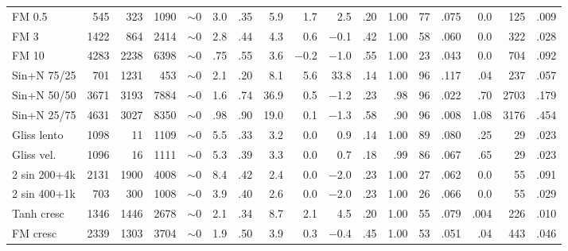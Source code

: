 \documentclass[a4paper,11pt]{article}
\begin{document}
{\begin{longtable}{l|rrrrr|rrrrr|rrr|rrr}
\midrule

FM 0.5
& 545 & 323 & 1090 & $\sim$0 & 3.0
& .35 & 5.9 & 1.7 & 2.5 & .20
& 1.00 & 77 & .075
& 0.0 & 125 & .009 \\

FM 3
& 1422 & 864 & 2414 & $\sim$0 & 2.8
& .44 & 4.3 & 0.6 & $-$0.1 & .42
& 1.00 & 58 & .060
& 0.0 & 322 & .028 \\

FM 10
& 4283 & 2238 & 6398 & $\sim$0 & .75
& .55 & 3.6 & $-$0.2 & $-$1.0 & .55
& 1.00 & 23 & .043
& 0.0 & 704 & .092 \\

\midrule

Sin+N 75/25
& 701 & 1231 & 453 & $\sim$0 & 2.1
& .20 & 8.1 & 5.6 & 33.8 & .14
& 1.00 & 96 & .117
& .04 & 237 & .057 \\

Sin+N 50/50
& 3671 & 3193 & 7884 & $\sim$0 & 1.6
& .74 & 36.9 & 0.5 & $-$1.2 & .23
& .98 & 96 & .022
& .70 & 2703 & .179 \\

Sin+N 25/75
& 4631 & 3027 & 8350 & $\sim$0 & .98
& .90 & 19.0 & 0.1 & $-$1.3 & .58
& .90 & 96 & .008
& 1.08 & 3176 & .454 \\

\midrule

Gliss lento
& 1098 & 11 & 1109 & $\sim$0 & 5.5
& .33 & 3.2 & 0.0 & 0.9 & .14
& 1.00 & 89 & .080
& .25 & 29 & .023 \\

Gliss vel.
& 1096 & 16 & 1111 & $\sim$0 & 5.3
& .39 & 3.3 & 0.0 & 0.7 & .18
& .99 & 86 & .067
& .65 & 29 & .023 \\

\midrule

2 sin 200+4k
& 2131 & 1900 & 4008 & $\sim$0 & 8.4
& .42 & 2.4 & 0.0 & $-$2.0 & .23
& 1.00 & 27 & .062
& 0.0 & 55 & .091 \\

2 sin 400+1k
& 703 & 300 & 1008 & $\sim$0 & 3.9
& .40 & 2.6 & 0.0 & $-$2.0 & .23
& 1.00 & 26 & .066
& 0.0 & 55 & .029 \\

\midrule

Tanh cresc
& 1346 & 1446 & 2678 & $\sim$0 & 2.1
& .34 & 8.7 & 2.1 & 4.5 & .20
& 1.00 & 55 & .079
& .004 & 226 & .010 \\

FM cresc
& 2339 & 1303 & 3704 & $\sim$0 & 1.9
& .50 & 3.9 & 0.3 & $-$0.4 & .45
& 1.00 & 53 & .051
& .04 & 443 & .046 \\

\end{longtable}
}
\end{document}
